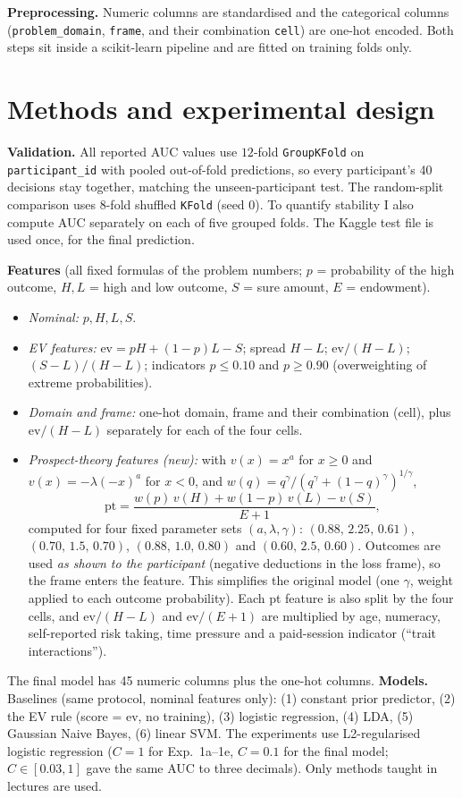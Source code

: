 \documentclass[11pt,a4paper]{article}
\begin{document}
\textbf{Preprocessing.} Numeric columns are standardised and the categorical columns (\texttt{problem\_\allowbreak domain}, \texttt{frame}, and their combination \texttt{cell}) are one-hot encoded. Both steps sit inside a scikit-learn pipeline and are fitted on training folds only.

\section{Methods and experimental design}\label{sec:methods}
\textbf{Validation.} All reported AUC values use $12$-fold \texttt{GroupKFold} on \texttt{participant\_id} with pooled out-of-fold predictions, so every participant's 40 decisions stay together, matching the unseen-participant test. The random-split comparison uses 8-fold shuffled \texttt{KFold} (seed 0). To quantify stability I also compute AUC separately on each of five grouped folds. The Kaggle test file is used once, for the final prediction.

\textbf{Features} (all fixed formulas of the problem numbers; $p$ = probability of the high outcome, $H,L$ = high and low outcome, $S$ = sure amount, $E$ = endowment).
\begin{itemize}
\item \emph{Nominal:} $p,H,L,S$.
\item \emph{EV features:} $\mathrm{ev}=pH+(1-p)L-S$; spread $H-L$; $\mathrm{ev}/(H-L)$; $(S-L)/(H-L)$; indicators $p\le0.10$ and $p\ge0.90$ (overweighting of extreme probabilities).
\item \emph{Domain and frame:} one-hot domain, frame and their combination (cell), plus $\mathrm{ev}/(H-L)$ separately for each of the four cells.
\item \emph{Prospect-theory features (new):} with $v(x)=x^{a}$ for $x\ge0$ and $v(x)=-\lambda(-x)^{a}$ for $x<0$, and $w(q)=q^{\gamma}/(q^{\gamma}+(1-q)^{\gamma})^{1/\gamma}$, 
\[
\mathrm{pt}=\frac{w(p)\,v(H)+w(1-p)\,v(L)-v(S)}{E+1},
\]
computed for four fixed parameter sets $(a,\lambda,\gamma)$: $(0.88,\,2.25,\,0.61)$, $(0.70,\,1.5,\,0.70)$, $(0.88,\,1.0,\,0.80)$ and $(0.60,\,2.5,\,0.60)$. Outcomes are used \emph{as shown to the participant} (negative deductions in the loss frame), so the frame enters the feature. This simplifies the original model (one $\gamma$, weight applied to each outcome probability). Each pt feature is also split by the four cells, and $\mathrm{ev}/(H-L)$ and $\mathrm{ev}/(E+1)$ are multiplied by age, numeracy, self-reported risk taking, time pressure and a paid-session indicator (``trait interactions'').
\end{itemize}
The final model has 45 numeric columns plus the one-hot columns.
\textbf{Models.} Baselines (same protocol, nominal features only): (1) constant prior predictor, (2) the EV rule (score = ev, no training), (3) logistic regression, (4) LDA, (5) Gaussian Naive Bayes, (6) linear SVM. The experiments use L2-regularised logistic regression ($C=1$ for Exp.~1a--1e, $C=0.1$ for the final model; $C\in[0.03,1]$ gave the same AUC to three decimals). Only methods taught in lectures are used.
\end{document}

